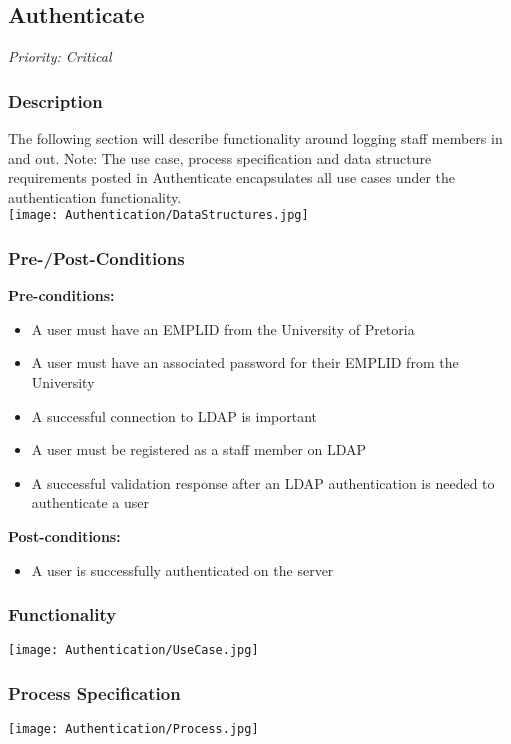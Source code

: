 


\subsection{Authenticate}
\textit{Priority: Critical} \\

\subsubsection{Description}
The following section will describe functionality around logging staff members in and out. Note: The use case, process specification and data structure requirements posted in Authenticate encapsulates all use cases under the authentication functionality. \\
\texttt{[image: Authentication/DataStructures.jpg]}


\subsubsection{Pre-/Post-Conditions}
	\textbf{Pre-conditions:} 
	\begin{itemize}
		\item A user must have an EMPLID from the University of Pretoria 
		\item A user must have an associated password for their EMPLID from the University
		\item A successful connection to LDAP is important
		\item A user must be registered as a staff member on LDAP
		\item A successful validation response after an LDAP authentication is needed to authenticate a user
	\end{itemize}
	\textbf{Post-conditions:} 
		\begin{itemize}
			\item A user is successfully authenticated on the server
		\end{itemize}

\subsubsection{Functionality}
	\texttt{[image: Authentication/UseCase.jpg]}	
	
\subsubsection{Process Specification}
	\texttt{[image: Authentication/Process.jpg]}

